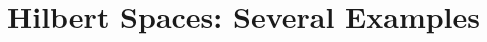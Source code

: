 \documentclass[../../main.tex]{subfiles}
\begin{document}
\chapter{Hilbert Spaces: Several Examples}
\end{document}
